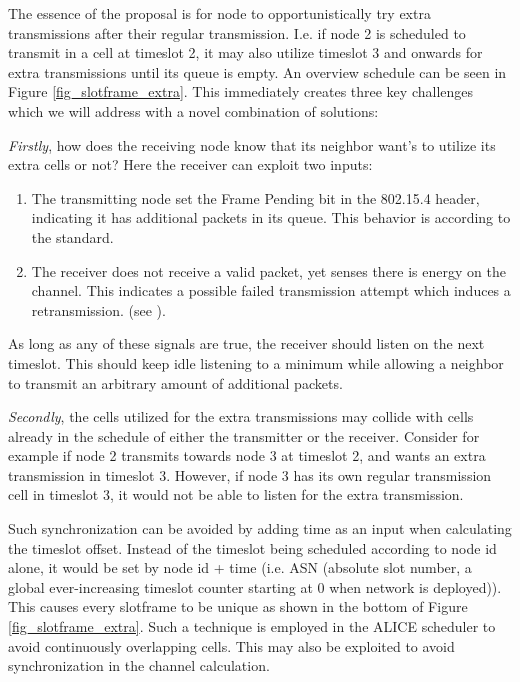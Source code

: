 \documentclass[journal,comsoc]{IEEEtran}
\begin{document}
The essence of the proposal is for node to opportunistically try extra transmissions after their regular transmission. I.e. if node 2 is scheduled to transmit in a cell at timeslot 2, it may also utilize timeslot 3 and onwards for extra transmissions until its queue is empty. An overview schedule can be seen in Figure \ref{fig_slotframe_extra}. This immediately creates three key challenges which we will address with a novel combination of solutions:

\textit{Firstly}, how does the receiving node know that its neighbor want's to utilize its extra cells or not? Here the receiver can exploit two inputs:
\begin{enumerate}
    \item The transmitting node set the Frame Pending bit in the 802.15.4 header, indicating it has additional packets in its queue. This behavior is according to the standard.
    \item The receiver does not receive a valid packet, yet senses there is energy on the channel. This indicates a possible failed transmission attempt which induces a retransmission. (see \cite{EnergyEfficientLinkCena2020}).
\end{enumerate}

As long as any of these signals are true, the receiver should listen on the next timeslot. This should keep idle listening to a minimum while allowing a neighbor to transmit an arbitrary amount of additional packets.%

\textit{Secondly}, the cells utilized for the extra transmissions may collide with cells already in the schedule of either the transmitter or the receiver. Consider for example if node 2 transmits towards node 3 at timeslot 2, and wants an extra transmission in timeslot 3. However, if node 3 has its own regular transmission cell in timeslot 3, it would not be able to listen for the extra transmission.

Such synchronization can be avoided by adding time as an input when calculating the timeslot offset. Instead of the timeslot being scheduled according to node id alone, it would be set by node id + time (i.e. ASN (absolute slot number, a global ever-increasing timeslot counter starting at 0 when network is deployed)). This causes every slotframe to be unique as shown in the bottom of Figure \ref{fig_slotframe_extra}. Such a technique is employed in the ALICE \cite{ALICEAutonomousLinkKim2019} scheduler to avoid continuously overlapping cells. This may also be exploited to avoid synchronization in the channel calculation.
\end{document}
